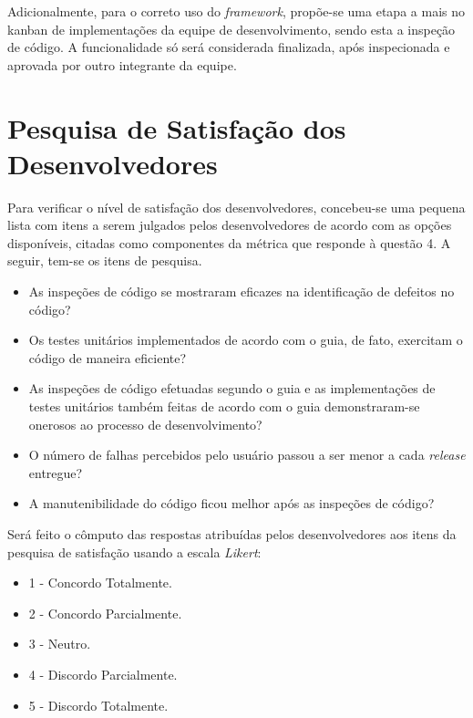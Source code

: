Adicionalmente, para o correto uso do \textit{framework}, propõe-se uma etapa a mais no kanban de implementações da equipe de desenvolvimento, sendo esta a inspeção de código. A funcionalidade só será considerada finalizada, após inspecionada e aprovada por outro integrante da equipe.

\section{Pesquisa de Satisfação dos Desenvolvedores}

Para verificar o nível de satisfação dos desenvolvedores, concebeu-se uma pequena lista com itens a serem julgados pelos desenvolvedores de acordo com as opções disponíveis, citadas como componentes da métrica que responde à questão 4. A seguir, tem-se os itens de pesquisa.

\begin{itemize}
	\item As inspeções de código se mostraram eficazes na identificação de defeitos no código?

	\item Os testes unitários implementados de acordo com o guia, de fato, exercitam o código de maneira eficiente?

	\item As inspeções de código efetuadas segundo o guia e as implementações de testes unitários também feitas de acordo com o guia demonstraram-se onerosos ao processo de desenvolvimento?

	\item O número de falhas percebidos pelo usuário passou a ser menor a cada \textit{release} entregue?

	\item A manutenibilidade do código ficou melhor após as inspeções de código?
\end{itemize}

Será feito o cômputo das respostas atribuídas pelos desenvolvedores aos itens da pesquisa de satisfação usando a escala \textit{Likert}: 

\begin{itemize}
	\item {1 - Concordo Totalmente}.
	\item {2 - Concordo Parcialmente}.
	\item {3 - Neutro}.
	\item {4 - Discordo Parcialmente}.
	\item {5 - Discordo Totalmente}.
\end{itemize}

